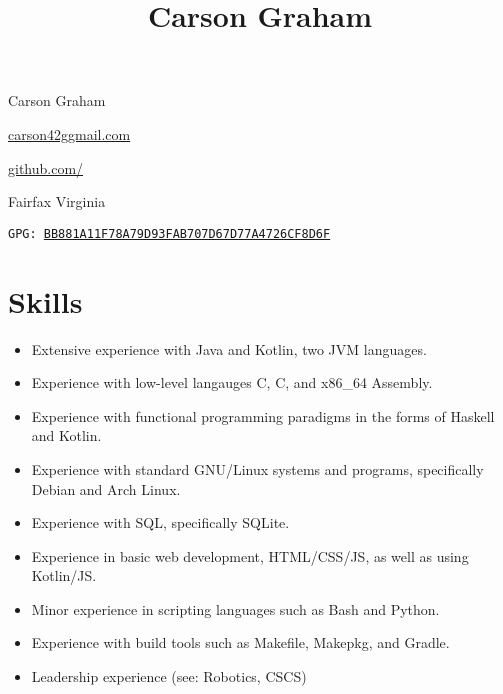 \documentclass[10pt,letterpaper]{article}
\title{Carson Graham}
\author{}
\date{}
\makeatletter
\def\link#1#2{\color{blue!60!black}\href{#1}{#2}\color{black}}
\newcommand{\CPP}
{C\nolinebreak[4]\hspace{-.05em}\raisebox{.35ex}{\footnotesize\bf ++}}
\newcommand{\email}
{carson42g\raisebox{-0.2ex}{@}gmail.com}
\newcommand{\github}
{github.com\hspace{-0.007em}/\hspace{-0.05em}{mee42}}
\def\code#1{\texttt{#1}}
\makeatother
\begin{document}
    \begin{center}
        \huge Carson Graham
    \end{center}

    \begin{adjustwidth}{0em}{0em}
        \begin{multicols}{3}
            \begin{center}
                \link{mailto:carson42g@gmail.com}{\email}
            \end{center}
            \columnbreak
            \begin{center}
                \link{https://github.com/mee42/}{\github}
            \end{center}
            \columnbreak
            \begin{center}
                Fairfax Virginia
            \end{center}
        \end{multicols}
    \end{adjustwidth}
    \vspace{-1em}
    \begin{center}
        \code{GPG: \link{https://keys.openpgp.org/search?q=BB881A11F78A79D93FAB707D67D77A4726CF8D6F}{BB881A11F78A79D93FAB707D67D77A4726CF8D6F}}
     \end{center}

        

    \section*{Skills}

    \begin{itemize}
        \item Extensive experience with Java and Kotlin, two JVM languages.
        \item Experience with low-level langauges C, \CPP, and x86\_64 Assembly.
        \item Experience with functional programming paradigms in the forms of Haskell and Kotlin.
        \item Experience with standard GNU/Linux systems and programs, specifically Debian and Arch Linux.
        \item Experience with SQL, specifically SQLite.
        \item Experience in basic web development, HTML/CSS/JS, as well as using Kotlin/JS.
        \item Minor experience in scripting languages such as Bash and Python.
        \item Experience with build tools such as Makefile, Makepkg, and Gradle.
        \item Leadership experience (see: Robotics, CSCS)
    \end{itemize}
\end{document}
